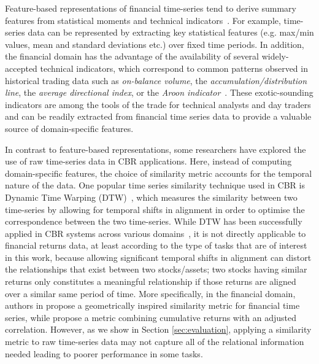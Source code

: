 \documentclass[runningheads]{llncs}
\begin{document}
Feature-based representations of financial time-series tend to derive summary features from statistical moments and technical indicators~\cite{gold2015indicators}. For example, time-series data can be represented by extracting key statistical features (e.g. max/min values, mean and standard deviations etc.) over fixed time periods. In addition, the financial domain has the advantage of the availability of several widely-accepted technical indicators, which correspond to common patterns observed in historical trading data such as \emph{on-balance volume}, the \emph{accumulation/distribution line}, the \emph{average directional index}, or the \emph{Aroon indicator}~\cite{gold2015indicators}. These exotic-sounding indicators are among the tools of the trade for technical analysts and day traders and can be readily extracted from financial time series data to provide a valuable source of domain-specific features.

In contrast to feature-based representations, some researchers have explored the use of raw time-series data in CBR applications. Here, instead of computing domain-specific features, the choice of similarity metric accounts for the temporal nature of the data. 
One popular time series similarity technique used in CBR is Dynamic Time Warping (DTW)~\cite{sakoe1978dynamic}, which measures the similarity between two time-series by allowing for temporal shifts in alignment in order to optimise the correspondence between the two time-series. While DTW has been successfully applied in CBR systems across various domains~\cite{delaney2022forecasting}, it is not directly applicable to financial returns data, at least according to the type of tasks that are of interest in this work, because allowing significant temporal shifts in alignment can distort the relationships that exist between two stocks/assets; two stocks having similar returns only constitutes a meaningful relationship if those returns are aligned over a similar same period of time. 
More specifically, in the financial domain, authors in \cite{chun2020geometric} propose a geometrically inspired similarity metric for financial time series, while \cite{dolphin2021measuring} propose a metric combining cumulative returns with an adjusted correlation. 
However, as we show in Section \ref{sec:evaluation}, applying a similarity metric to raw time-series data may not capture all of the relational information needed leading to poorer performance in some tasks.
\end{document}
